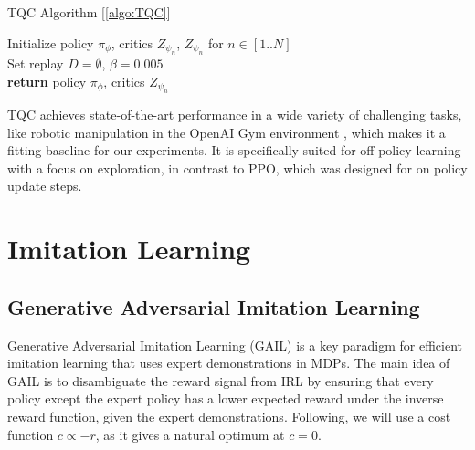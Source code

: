 \begin{algorithm}
    \caption{TQC Algorithm [\ref{algo:TQC}]}
    \label{algo:TQC}
    \begin{algorithmic}
        \State Initialize policy $\pi_{\phi}$, critics $Z_{\psi_n}$, $Z_{\psi_n}$ for $n \in [1..N]$\\
        \State Set replay $D = \emptyset$, $\beta = 0.005$\\
        \State \textbf{return} policy $\pi_{\phi}$, critics $Z_{\psi_n}$
    \end{algorithmic}
\end{algorithm}
TQC achieves state-of-the-art performance in a wide variety of challenging tasks, like robotic manipulation in the OpenAI Gym environment \cite{1606.01540}, which makes it a fitting baseline 
for our experiments. It is specifically suited 
for off policy learning with a focus on exploration, in contrast to PPO, which was designed for on policy update steps.

\section{Imitation Learning}
\subsection{Generative Adversarial Imitation Learning}
Generative Adversarial Imitation Learning (GAIL) \cite{ho2016generative} is a key paradigm for efficient imitation learning that uses expert demonstrations in MDPs. 
The main idea of GAIL is to disambiguate the reward signal from IRL by ensuring that every policy except the expert policy has a lower expected reward under the inverse reward function, given the expert 
demonstrations. Following, we will use a cost function $c \propto -r$, as it gives a natural optimum at $c=0$.\\

